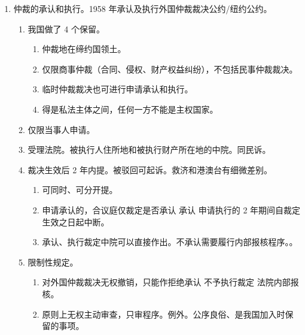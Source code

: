 \begin{enumerate}
\begin{kk}{要求}
\begin{enumerate}
            \item 判决已生效、不违反公序良俗、不属于我国法院专属管辖。
            \item 原则上拒绝承认缺席判决 \hz 裁定。例外。已合法传唤 + 判决 \hz 裁定已对此说明。
          \end{enumerate}
        \end{kk}
  \item 仲裁的承认和执行。1958 年承认及执行外国仲裁裁决公约/纽约公约。
        \begin{enumerate}
          \item 我国做了 4 个保留。
                \begin{enumerate}
                  \item 仲裁地在缔约国领土。
                  \item 仅限商事仲裁（合同、侵权、财产权益纠纷），不包括民事仲裁裁决。
                  \item 临时仲裁裁决也可进行申请承认和执行。
                  \item 得是私法主体之间，任何一方不能是主权国家。
                \end{enumerate}
          \item 仅限当事人申请。
          \item 受理法院。被执行人住所地和被执行财产所在地的中院。同民诉。
          \item 裁决生效后 2 年内提。被驳回可起诉。救济和港澳台有细微差别。
                \begin{enumerate}
                  \item 可同时、可分开提。
                  \item 申请承认的，合议庭仅裁定是否承认 \yjt 承认 \yjt 申请执行的 2 年期间自裁定生效之日起中断。
                  \item 承认、执行裁定中院可以直接作出。不承认需要履行内部报核程序。。
                \end{enumerate}
          \item 限制性规定。
                \begin{enumerate}
                  \item 对外国仲裁裁决无权撤销，只能作拒绝承认 \hz 不予执行裁定 \yjt 法院内部报核。
                  \item 原则上无权主动审查，只审程序。例外。公序良俗、是我国加入时保留的事项。
                \end{enumerate}
        \end{enumerate}
\end{enumerate}
